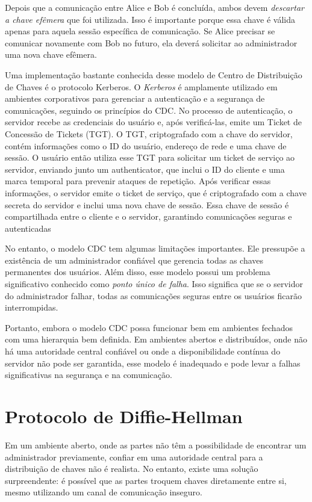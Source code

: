 Depois que a comunicação entre Alice e Bob é concluída, ambos devem {\em descartar a chave efêmera} que foi utilizada.
Isso é importante porque essa chave é válida apenas para aquela sessão específica de comunicação.
Se Alice precisar se comunicar novamente com Bob no futuro, ela deverá solicitar ao administrador uma nova chave efêmera.

Uma implementação bastante conhecida desse modelo de Centro de Distribuição de Chaves é o protocolo Kerberos.
O {\em Kerberos} é amplamente utilizado em ambientes corporativos para gerenciar a autenticação e a segurança de comunicações, seguindo os princípios do CDC.
No processo de autenticação, o servidor recebe as credenciais do usuário e, após verificá-las, emite um Ticket de Concessão de Tickets (TGT).
O TGT, criptografado com a chave do servidor, contém informações como o ID do usuário, endereço de rede e uma chave de sessão.
O usuário então utiliza esse TGT para solicitar um ticket de serviço ao servidor, enviando junto um authenticator, que inclui o ID do cliente e uma marca temporal para prevenir ataques de repetição.
Após verificar essas informações, o servidor emite o ticket de serviço, que é criptografado com a chave secreta do servidor e inclui uma nova chave de sessão.
Essa chave de sessão é compartilhada entre o cliente e o servidor, garantindo comunicações seguras e autenticadas​

No entanto, o modelo CDC tem algumas limitações importantes.
Ele pressupõe a existência de um administrador confiável que gerencia todas as chaves permanentes dos usuários.
Além disso, esse modelo possui um problema significativo conhecido como {\em ponto único de falha}.
Isso significa que se o servidor do administrador falhar, todas as comunicações seguras entre os usuários ficarão interrompidas.

Portanto, embora o modelo CDC possa funcionar bem em ambientes fechados com uma hierarquia bem definida.
Em ambientes abertos e distribuídos, onde não há uma autoridade central confiável ou onde a disponibilidade contínua do servidor não pode ser garantida, esse modelo é inadequado e pode levar a falhas significativas na segurança e na comunicação.

\section{Protocolo de Diffie-Hellman}
\label{sec:diffie-hellman}


Em um ambiente aberto, onde as partes não têm a possibilidade de encontrar um administrador previamente, confiar em uma autoridade central para a distribuição de chaves não é realista.
No entanto, existe uma solução surpreendente:
é possível que as partes troquem chaves diretamente entre si, mesmo utilizando um canal de comunicação inseguro.

